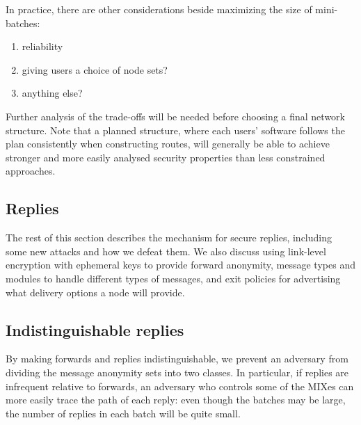 \documentclass{llncs}
\begin{document}
In practice, there are other considerations beside maximizing the
size of mini-batches:

\begin{enumerate}
\item reliability
\item giving users a choice of node sets?
\item anything else?
\end{enumerate}

Further analysis of the trade-offs will be needed before choosing a
final network structure. Note that a planned structure, where each
users' software follows the plan consistently when constructing
routes, will generally be able to achieve stronger and more easily
analysed security properties than less constrained approaches.

\subsection{Replies}
\label{subsec:replies}

The rest of this section describes the mechanism for secure replies,
including some new attacks and how we defeat them. We also discuss using
link-level encryption with ephemeral keys to provide forward anonymity,
message types and modules to handle different types of messages, and
exit policies for advertising what delivery options a node will provide.


\subsection{Indistinguishable replies}
\label{subsec:header-swap}

By making forwards and replies indistinguishable, we prevent an adversary
from dividing the message anonymity sets into two classes. In particular,
if replies are infrequent relative to forwards, an adversary who controls
some of the MIXes can more easily trace the path of each reply:  even
though the batches may be large, the number of replies in each batch
will be quite small.
\end{document}
